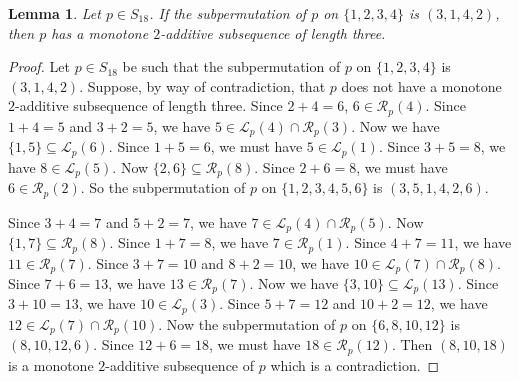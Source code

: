 \documentclass[10pt,a4paper]{amsart}
\newtheorem{lemma}[theorem]{Lemma}
\begin{document}
\begin{lemma}\label{Lemma:Monotone3142}
Let $p\in S_{18}$. If the subpermutation of $p$ on $\{1,2,3,4\}$ is $(3,1,4,2)$, then $p$ has a monotone $2$-additive subsequence of length three.
\end{lemma}
\begin{proof}
    Let $p\in S_{18}$ be such that the subpermutation of $p$ on $\{1,2,3,4\}$ is $(3,1,4,2)$. Suppose, by way of contradiction, that $p$ does not have a monotone $2$-additive subsequence of length three. Since $2+4=6$, $6\in\mathcal{R}_p(4)$. Since $1+4=5$ and $3+2=5$, we have $5\in\mathcal{L}_p(4)\cap\mathcal{R}_p(3)$. Now we have $\{1,5\}\subseteq\mathcal{L}_p(6)$. Since $1+5=6$, we must have $5\in\mathcal{L}_p(1)$. Since $3+5=8$, we have $8\in\mathcal{L}_p(5)$. Now $\{2,6\}\subseteq\mathcal{R}_p(8)$. Since $2+6=8$, we must have $6\in\mathcal{R}_p(2)$. So the subpermutation of $p$ on $\{1,2,3,4,5,6\}$ is $(3,5,1,4,2,6)$.

    Since $3+4=7$ and $5+2=7$, we have $7\in\mathcal{L}_p(4)\cap\mathcal{R}_p(5)$. Now $\{1,7\}\subseteq\mathcal{R}_p(8)$. Since $1+7=8$, we have $7\in\mathcal{R}_p(1)$. Since $4+7=11$, we have $11\in\mathcal{R}_p(7)$. Since $3+7=10$ and $8+2=10$, we have $10\in\mathcal{L}_p(7)\cap\mathcal{R}_p(8)$. Since $7+6=13$, we have $13\in\mathcal{R}_p(7)$. Now we have $\{3,10\}\subseteq\mathcal{L}_p(13)$. Since $3+10=13$, we have $10\in\mathcal{L}_p(3)$. Since $5+7=12$ and $10+2=12$, we have $12\in\mathcal{L}_p(7)\cap\mathcal{R}_p(10)$. Now the subpermutation of $p$ on $\{6,8,10,12\}$ is $(8,10,12,6)$. Since $12+6=18$, we must have $18\in\mathcal{R}_p(12)$. Then $(8,10,18)$ is a monotone $2$-additive subsequence of $p$ which is a contradiction. 
\end{proof}
\end{document}

